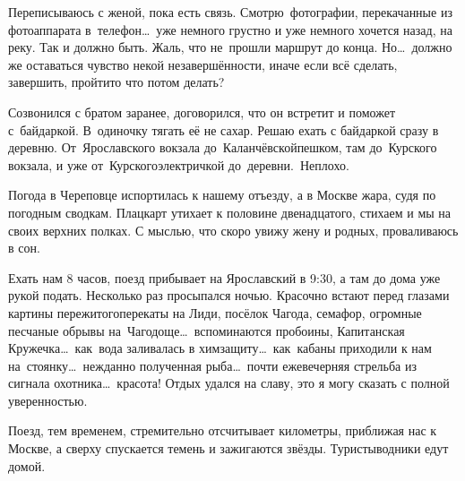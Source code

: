 Переписываюсь с женой, пока есть связь. Смотрю~фотографии, перекачанные из фотоаппарата в~телефон\ldots~уже немного грустно и уже немного хочется назад, на реку. Так и должно быть. Жаль, что не~прошли маршрут до конца. Но\ldots~должно же оставаться чувство некой незавершённости, иначе если всё сделать, завершить, пройти\mdash то что потом делать? 

Созвонился с братом заранее, договорился, что он встретит и поможет с~байдаркой. В~одиночку тягать её не сахар. Решаю ехать с байдаркой сразу в деревню. От~Ярославского вокзала до~Каланчёвской\mdash пешком, там до~Курского вокзала, и уже от~Курского\mdash электричкой до~деревни.~Неплохо. 

Погода в Череповце испортилась к нашему отъезду, а в Москве жара, судя по погодным сводкам. Плацкарт утихает к половине двенадцатого, стихаем и мы на своих верхних полках. С мыслью, что скоро увижу жену и родных, проваливаюсь в сон. 

Ехать нам 8 часов, поезд прибывает на Ярославский в 9:30, а там до дома уже рукой подать. Несколько раз просыпался ночью. Красочно встают перед глазами картины пережитого\mdash перекаты на Лиди, посёлок Чагода, семафор, огромные песчаные обрывы на~Чагодоще\ldots~вспоминаются пробоины, Капитанская Кружечка\ldots~как~вода заливалась в химзащиту\ldots~как~кабаны приходили к нам на~стоянку\ldots~нежданно полученная рыба\ldots~почти ежевечерняя стрельба из сигнала охотника\ldots~красота! Отдых удался на славу, это я могу сказать с полной уверенностью. 

Поезд, тем временем, стремительно отсчитывает километры, приближая нас к Москве, а сверху спускается темень и зажигаются звёзды. Туристы\sdash водники едут домой.     

\begin{center}
\end{center}